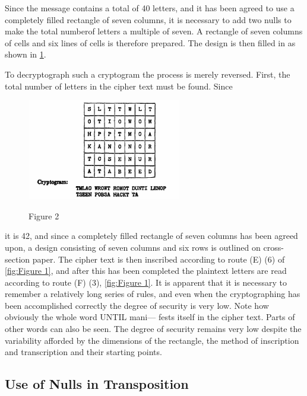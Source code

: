 Since the message contains a total of 40 letters, and it has been
agreed to use a completely filled rectangle of seven columns, it is
necessary to add two nulls to make the total numberof letters a
multiple of seven. A rectangle of seven columns of cells and six
lines of cells is therefore prepared. The design is then filled in as
shown in \ref{fig:Figure 2}.

\mypara To decryptograph such a cryptogram the process is merely reversed.
First, the total number of letters in the cipher text must be found. Since

\begin{figure}[h]
  \centering
    \includegraphics[width=0.6\textwidth,natwidth=390,natheight=256]{Chapter2_Figure2.png}
    \label{fig:Figure 2}
    \caption{Figure 2}
\end{figure}

it is 42, and since a completely filled rectangle of seven columns has been
agreed upon, a design consisting of seven columns and six rows is outlined on cross-section paper. The cipher text is then inscribed according
to route (E) (6) of \ref{fig:Figure 1}, and after this has been completed the plaintext letters are read according to route (F) (3), \ref{fig:Figure 1}. It is apparent
that it is necessary to remember a relatively long series of rules, and even
when the cryptographing has been accomplished correctly the degree of
security is very low. Note how obviously the whole word UNTIL mani—
fests itself in the cipher text. Parts of other words can also be seen.
The degree of security remains very low despite the variability afforded
by the dimensions of the rectangle, the method of inscription and transcription and their starting points.

\subsection{Use of Nulls in Transposition}

